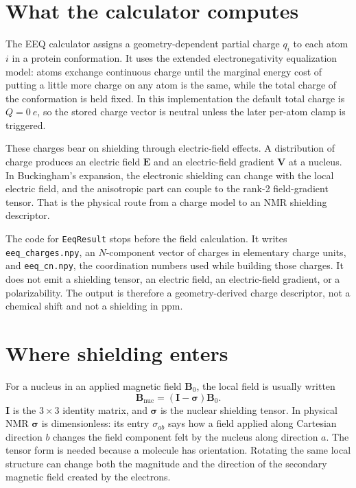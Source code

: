 \documentclass[11pt]{article}
\begin{document}

\section{What the calculator computes}

The EEQ calculator assigns a geometry-dependent partial charge \(q_i\) to each
atom \(i\) in a protein conformation. It uses the extended electronegativity
equalization model: atoms exchange continuous charge until the marginal energy
cost of putting a little more charge on any atom is the same, while the total
charge of the conformation is held fixed. In this implementation the default
total charge is \(Q=\SI{0}{\elementarycharge}\), so the stored charge vector is
neutral unless the later per-atom clamp is triggered.

These charges bear on shielding through electric-field effects. A distribution
of charge produces an electric field \(\bm E\) and an electric-field gradient
\(\bm V\) at a nucleus. In Buckingham's expansion, the electronic shielding can
change with the local electric field, and the anisotropic part can couple to the
rank-2 field-gradient tensor. That is the physical route from a charge model to
an NMR shielding descriptor.

The code for \texttt{EeqResult} stops before the field calculation. It writes
\texttt{eeq\_charges.npy}, an \(N\)-component vector of charges in elementary
charge units, and \texttt{eeq\_cn.npy}, the coordination numbers used while
building those charges. It does not emit a shielding tensor, an electric field,
an electric-field gradient, or a polarizability. The output is therefore a
geometry-derived charge descriptor, not a chemical shift and not a shielding in
ppm.

\section{Where shielding enters}

For a nucleus in an applied magnetic field \(\bm B_0\), the local field is
usually written
\begin{equation}
  \bm B_{\mathrm{nuc}} = (\bm I-\bm\sigma)\bm B_0 .
  \label{eq:shielding}
\end{equation}
\(\bm I\) is the \(3\times3\) identity matrix, and \(\bm\sigma\) is the nuclear
shielding tensor. In physical NMR \(\bm\sigma\) is dimensionless: its entry
\(\sigma_{ab}\) says how a field applied along Cartesian direction \(b\) changes
the field component felt by the nucleus along direction \(a\). The tensor form
is needed because a molecule has orientation. Rotating the same local structure
can change both the magnitude and the direction of the secondary magnetic field
created by the electrons.
\end{document}
